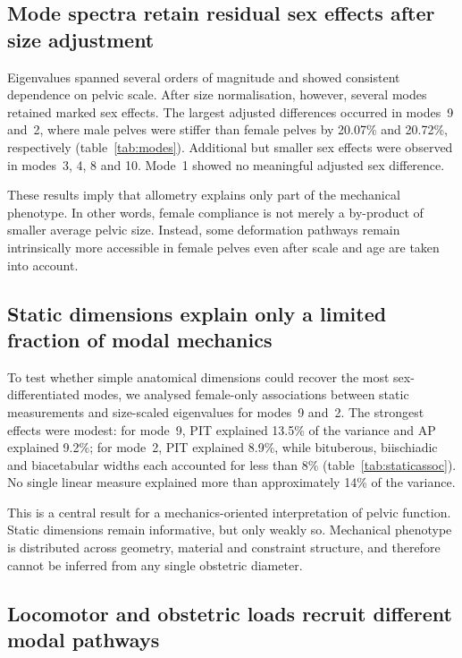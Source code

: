 \documentclass[11pt,a4paper]{article}
\begin{document}
\subsection{Mode spectra retain residual sex effects after size adjustment}

Eigenvalues spanned several orders of magnitude and showed consistent dependence on pelvic scale. After size normalisation, however, several modes retained marked sex effects. The largest adjusted differences occurred in modes~9 and~2, where male pelves were stiffer than female pelves by 20.07\% and 20.72\%, respectively (table~\ref{tab:modes}). Additional but smaller sex effects were observed in modes~3, 4, 8 and 10. Mode~1 showed no meaningful adjusted sex difference.

These results imply that allometry explains only part of the mechanical phenotype. In other words, female compliance is not merely a by-product of smaller average pelvic size. Instead, some deformation pathways remain intrinsically more accessible in female pelves even after scale and age are taken into account.

\subsection{Static dimensions explain only a limited fraction of modal mechanics}

To test whether simple anatomical dimensions could recover the most sex-differentiated modes, we analysed female-only associations between static measurements and size-scaled eigenvalues for modes~9 and~2. The strongest effects were modest: for mode~9, PIT explained 13.5\% of the variance and AP explained 9.2\%; for mode~2, PIT explained 8.9\%, while bituberous, biischiadic and biacetabular widths each accounted for less than 8\% (table~\ref{tab:staticassoc}). No single linear measure explained more than approximately 14\% of the variance.

This is a central result for a mechanics-oriented interpretation of pelvic function. Static dimensions remain informative, but only weakly so. Mechanical phenotype is distributed across geometry, material and constraint structure, and therefore cannot be inferred from any single obstetric diameter.

\subsection{Locomotor and obstetric loads recruit different modal pathways}
\end{document}
